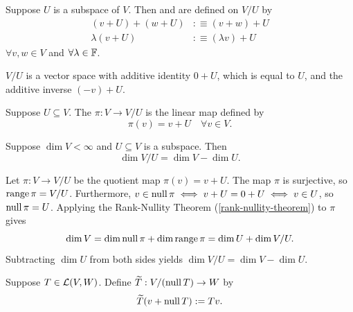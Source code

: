 \begin{mydef} 
  Suppose $U$ is a subspace of $V$. Then  and  are defined on $V/U$ by
  \begin{equation}
    \begin{aligned}
      (v+U)+(w+U) & :\equiv (v+w) + U \\
      \lambda (v+U) & :\equiv (\lambda v) + U
    \end{aligned}
  \end{equation}
  $\forall v,w \in V$ and $\forall \lambda \in \mathbb{F}$.
\end{mydef}


\begin{thm} 
  $V/U$ is a vector space with additive identity $0+U$, which is equal to $U$, and the additive inverse $(-v)+U$.
\end{thm}

\begin{mydef} 
  Suppose $U \subseteq V$. The  $\pi: V \to V/U$ is the linear map defined by
  \begin{equation}
    \pi(v)=v+U \quad \forall v \in V.
  \end{equation}
\end{mydef}

\begin{thm}
  \label{thm: dimension of quotient space}
  Suppose $\dim V < \infty$ and $U \subseteq V$ is a subspace. Then
  \begin{equation}
    \dim V/U = \dim V - \dim U.
  \end{equation}
\end{thm}
\begin{prf}
  Let $\pi: V \to V/U$ be the quotient map $\pi(v) = v + U$.
  The map $\pi$ is surjective, so $\operatorname{range} \pi = V/U$. Furthermore, $v \in \operatorname{null} \pi \iff v + U = 0 + U \iff v \in U$, so $\operatorname{null} \pi = U$.
  Applying the Rank-Nullity Theorem (\ref{rank-nullity-theorem}) to $\pi$ gives
  \begin{equation}
    \dim V = \dim \operatorname{null} \pi + \dim \operatorname{range} \pi = \dim U + \dim V/U.
  \end{equation}
  Subtracting $\dim U$ from both sides yields $\dim V/U = \dim V - \dim U$.
\end{prf}

\begin{mydef}
  Suppose $T \in \mathcal{L}(V,W)$. Define $\widetilde{T}: V/(\operatorname{null} T) \to W$ by
  \begin{equation}
    \widetilde{T}(v+\operatorname{null} T) := Tv.
  \end{equation}
\end{mydef}

